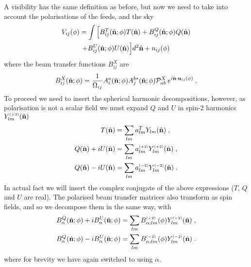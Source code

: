 \documentclass[prd,twocolumn,nofootinbib]{revtex4}
\begin{document}
A visibility has the same definition as before, but now we need to take into
account the polarisations of the feeds, and the sky
\begin{multline}
\label{eq:vispol}
V_{ij}(\phi) = \int \, \Bigl[ B^T_{ij}(\hat{\mathbf{n}}; \phi) T(\hat{\mathbf{n}}) + B^Q_{ij}(\hat{\mathbf{n}}; \phi) Q(\hat{\mathbf{n}})\\
  + B^U_{ij}(\hat{\mathbf{n}}; \phi) U(\hat{\mathbf{n}}) \Bigr] d^2\hat{\mathbf{n}} + n_{ij}(\phi)
\end{multline}
where the beam transfer functions $B^X_{ij}$ are
\begin{equation}
B^X_{ij}(\hat{\mathbf{n}}; \phi) = \frac{1}{\Omega_{ij}}A_i^a(\hat{\mathbf{n}}; \phi) A_j^{b *}(\hat{\mathbf{n}}; \phi)
\mathcal{P}^X_{ab} \:e^{i \hat{\mathbf{n}} \cdot
  \mathbf{u}_{ij}(\phi)} \; .
\end{equation}
To proceed we need to insert the spherical harmonic decompositions, however, as
polarisation is not a scalar field we must expand $Q$ and $U$ in spin-2
harmonics $Y_{lm}^{\scriptscriptstyle \left(\pm 2\right)}(\hat{\mathbf{n}})$
\begin{align}
T(\hat{\mathbf{n}}) & = \sum_{lm} a^T_{lm} Y_{lm}(\hat{\mathbf{n}}) \; ,\\
Q(\hat{\mathbf{n}}) + i U(\hat{\mathbf{n}}) & = \sum_{lm} a^{\scriptscriptstyle \left(+2\right)}_{lm}
Y^{\scriptscriptstyle \left(+2\right)}_{lm}(\hat{\mathbf{n}}) \; ,\\
Q(\hat{\mathbf{n}}) - i U(\hat{\mathbf{n}}) & = \sum_{lm} a^{\scriptscriptstyle \left(-2\right)}_{lm}
Y^{\scriptscriptstyle \left(-2\right)}_{lm}(\hat{\mathbf{n}}) \; .
\end{align}
In actual fact we will insert the complex conjugate of the above expressions
($T$, $Q$ and $U$ are real). The polarised beam transfer matrices also transform
as spin fields, and so we decompose them in the same way, with
\begin{align}
B^Q_{\alpha}(\hat{\mathbf{n}}; \phi) + i B^U_{\alpha}(\hat{\mathbf{n}}; \phi) & = \sum_{lm}
B^{\scriptscriptstyle \left(+2\right)}_{\alpha;lm} (\phi)
Y^{\scriptscriptstyle \left(+2\right)}_{lm}(\hat{\mathbf{n}}) \; ,\\
B^Q_{\alpha}(\hat{\mathbf{n}}; \phi) - i B^U_{\alpha}(\hat{\mathbf{n}}; \phi) & = \sum_{lm}
B^{\scriptscriptstyle \left(-2\right)}_{\alpha;lm} (\phi)
Y^{\scriptscriptstyle \left(-2\right)}_{lm}(\hat{\mathbf{n}}) \; .
\end{align}
where for brevity we have again switched to using $\alpha$.
\end{document}
